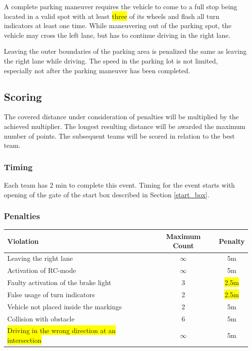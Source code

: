 \documentclass[a4paper]{report}
\begin{document}
{{A complete parking maneuver requires the vehicle to come to a full stop being located in a valid spot with at least \colorbox{yellow}{three} of its wheels and flash all turn indicators at least one time. While maneuvering out of the parking spot, the vehicle may cross the left lane, but has to continue driving in the right lane. 

Leaving the outer boundaries of the parking area is penalized the same as leaving the right lane while driving. The speed in the parking lot is not limited, especially not after the parking maneuver has been completed. 

\subsection{Scoring}
\label{freedrive_scoring}

The covered distance under consideration of penalties will be multiplied by the achieved multiplier. The longest resulting distance will be awarded the maximum number of points. The subsequent teams will be scored in relation to the best team. 

\subsubsection{Timing}

Each team has 2 min to complete this event. Timing for the event starts with opening of the gate of the start box described in Section \ref{start_box}. 

\subsubsection{Penalties}
\label{freedrive_penalties}

\begin{table}[H]
\begin{tabular}{@{}lcc@{}}
\toprule
\textbf{Violation}                     			& \textbf{Maximum Count} & \textbf{Penalty} \\ \midrule
Leaving the right lane                 			& $\infty$               & 5m               \\
Activation of RC-mode                  			& $\infty$               & 5m               \\
Faulty activation of the brake light       	    & 3                      & \colorbox{yellow}{2.5m}       \\
False usage of turn indicators         			& 2                      & \colorbox{yellow}{2.5m}               \\
Vehicle not placed inside the markings 			& 2                      & 5m               \\
Collision with obstacle                			& 6                      & 5m               \\ 
\colorbox{yellow}{Driving in the wrong direction at an intersection}	& $\infty$               & 5m               \\\bottomrule
\end{tabular}
\end{table}

}}
\end{document}

